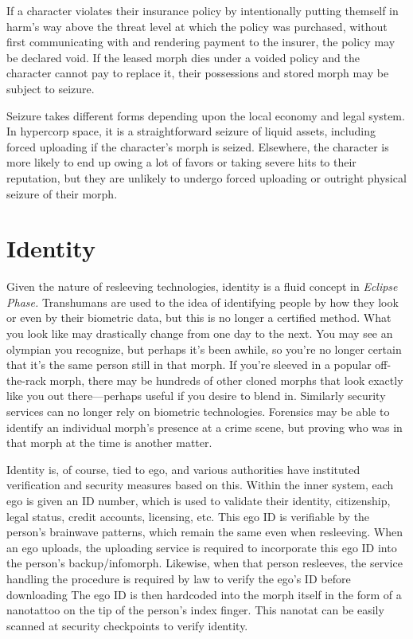 If a character violates their insurance policy by intentionally putting themself in harm's way above the threat level at which the policy was purchased, without first communicating with and rendering payment to the insurer, the policy may be declared void. If the leased morph dies under a voided policy and the character cannot pay to replace it, their possessions and stored morph may be subject to seizure. 

Seizure takes different forms depending upon the local economy and legal system. In hypercorp space, it is a straightforward seizure of liquid assets, including forced uploading if the character's morph is seized. Elsewhere, the character is more likely to end up owing a lot of favors or taking severe hits to their reputation, but they are unlikely to undergo forced uploading or outright physical seizure of their morph. 

\section{Identity} 

Given the nature of resleeving technologies, identity is a fluid concept in \textit{Eclipse Phase.} Transhumans are used to the idea of identifying people by how they look or even by their biometric data, but this is no longer a certified method. What you look like may drastically change from one day to the next. You may see an olympian you recognize, but perhaps it's been awhile, so you're no longer certain that it's the same person still in that morph. If you're sleeved in a popular off-the-rack morph, there may be hundreds of other cloned morphs that look exactly like you out there—perhaps useful if you desire to blend in. Similarly security services can no longer rely on biometric technologies. Forensics may be able to identify an individual morph's presence at a crime scene, but proving who was in that morph at the time is another matter. 

Identity is, of course, tied to ego, and various authorities have instituted verification and security measures based on this. Within the inner system, each ego is given an ID number, which is used to validate their identity, citizenship, legal status, credit accounts, licensing, etc. This ego ID is verifiable by the person's brainwave patterns, which remain the same even when resleeving. When an ego uploads, the uploading service is required to incorporate this ego ID into the person's backup/infomorph. Likewise, when that person resleeves, the service handling the procedure is required by law to verify the ego's ID before downloading The ego ID is then hardcoded into the morph itself in the form of a nanotattoo on the tip of the person's index finger. This nanotat can be easily scanned at security checkpoints to verify identity. 

